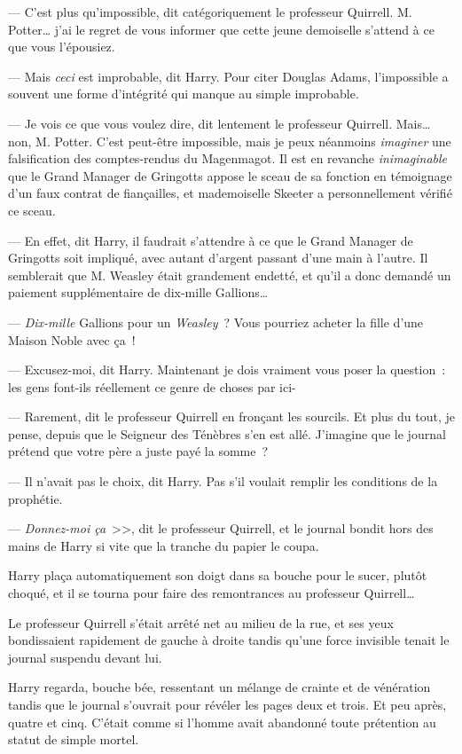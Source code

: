 --- C'est plus qu'impossible, dit catégoriquement le professeur Quirrell. M. Potter… j'ai le regret de vous informer que cette jeune demoiselle s'attend à ce que vous l'épousiez.

--- Mais \emph{ceci} est improbable, dit Harry. Pour citer Douglas Adams, l'impossible a souvent une forme d'intégrité qui manque au simple improbable.

--- Je vois ce que vous voulez dire, dit lentement le professeur Quirrell. Mais… non, M. Potter. C'est peut-être impossible, mais je peux néanmoins \emph{imaginer} une falsification des comptes-rendus du Magenmagot. Il est en revanche \emph{inimaginable} que le Grand Manager de Gringotts appose le sceau de sa fonction en témoignage d'un faux contrat de fiançailles, et mademoiselle Skeeter a personnellement vérifié ce sceau.

--- En effet, dit Harry, il faudrait s'attendre à ce que le Grand Manager de Gringotts soit impliqué, avec autant d'argent passant d'une main à l'autre. Il semblerait que M. Weasley était grandement endetté, et qu'il a donc demandé un paiement supplémentaire de dix-mille Gallions…

--- \emph{Dix-mille} Gallions pour un \emph{Weasley}~? Vous pourriez acheter la fille d'une Maison Noble avec ça~!

--- Excusez-moi, dit Harry. Maintenant je dois vraiment vous poser la question~: les gens font-ils réellement ce genre de choses par ici-

--- Rarement, dit le professeur Quirrell en fronçant les sourcils. Et plus du tout, je pense, depuis que le Seigneur des Ténèbres s'en est allé. J'imagine que le journal prétend que votre père a juste payé la somme~?

--- Il n'avait pas le choix, dit Harry. Pas s'il voulait remplir les conditions de la prophétie.

--- \emph{Donnez-moi ça}~>>, dit le professeur Quirrell, et le journal bondit hors des mains de Harry si vite que la tranche du papier le coupa.

Harry plaça automatiquement son doigt dans sa bouche pour le sucer, plutôt choqué, et il se tourna pour faire des remontrances au professeur Quirrell…

Le professeur Quirrell s'était arrêté net au milieu de la rue, et ses yeux bondissaient rapidement de gauche à droite tandis qu'une force invisible tenait le journal suspendu devant lui.

Harry regarda, bouche bée, ressentant un mélange de crainte et de vénération tandis que le journal s'ouvrait pour révéler les pages deux et trois. Et peu après, quatre et cinq. C'était comme si l'homme avait abandonné toute prétention au statut de simple mortel.

